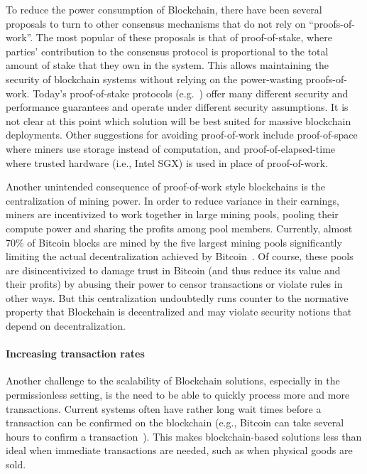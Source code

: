 To reduce the power consumption of Blockchain, there have been several proposals to turn to other consensus mechanisms that do not rely on ``proofs-of-work''.  The most popular of these proposals is that of proof-of-stake, where parties' contribution to the consensus protocol is proportional to the total amount of stake that they own in the system.  This allows maintaining the security of blockchain systems without relying on the power-wasting proofs-of-work.  Today's proof-of-stake protocols (e.g.~\cite{FC:BenGabMiz16,eprint:BenPasShi16,CRYPTO:KRDO17,SOSP:GHMVZ17,eprint:FanZho17}) offer many different security and performance guarantees and operate under different security assumptions.  It is not clear at this point which solution will be best suited for massive blockchain deployments.  Other suggestions for avoiding proof-of-work include proof-of-space~\cite{CRYPTO:DFKP15, eprint:PPKAFG15} where miners use storage instead of computation, and proof-of-elapsed-time~\cite{SSS:CXSGLS17} where trusted hardware (i.e., Intel SGX) is used in place of proof-of-work.

Another unintended consequence of proof-of-work style blockchains is the centralization of mining power.  In order to reduce variance in their earnings, miners are incentivized to work together in large mining pools, pooling their compute power and sharing the profits among pool members.  Currently, almost 70\% of Bitcoin blocks are mined by the five largest mining pools \cite{BlockchainInfoPools} significantly limiting the actual decentralization achieved by Bitcoin~\cite{arxiv:GBERS18}. Of course, these pools are disincentivized to damage trust in Bitcoin (and thus reduce its value and their profits) by abusing their power to censor transactions or violate rules in other ways. But this centralization undoubtedly runs counter to the normative property that Blockchain is decentralized and may violate security notions that depend on decentralization.  

\paragraph{Increasing transaction rates}
Another challenge to the scalability of Blockchain solutions, especially in the permissionless setting, is the need to be able to quickly process more and more transactions. Current systems often have rather long wait times before a transaction can be confirmed on the blockchain (e.g., Bitcoin can take several hours to confirm a transaction~\cite{BlockchainInfoTransactionConfTime}).  This makes blockchain-based solutions less than ideal when immediate transactions are needed, such as when physical goods are sold.

